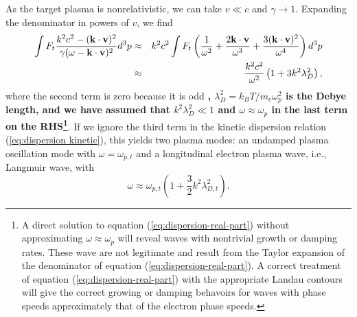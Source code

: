 \documentclass[usenatbib,iop,apj]{emulateapj}
\newcommand\cc[1]{{\color{blue} \bf #1}}
\newcommand\bmath[1] {\mbox{\boldmath$\rm #1$}}
\newcommand{\vel}{\ensuremath{\bmath{v}}}
\newcommand{\kvec}{\ensuremath{\bmath{k}}}
\begin{document}
As the target plasma is nonrelativistic, we can take $v\ll c$ and $\gamma \rightarrow 1$.  Expanding the denominator in powers of $v$, we find
\begin{eqnarray}
 \int F_t\frac{k^2c^2 - (\kvec\cdot\vel)^2}{\gamma(\omega - \kvec\cdot\vel)^2} d^3p &\approx& k^2c^2
 \int F_t \left(\frac {1}{\omega^2} + \frac {2\kvec\cdot\vel}{\omega^3} + \frac{3 (\kvec\cdot\vel)^2}{\omega^4}\right) d^3p \nonumber \\
&\approx& \frac {k^2c^2}{\omega^2}\left(1 + 3 {k^2\lambda_D^2}\right),
\label{eq:dispersion-real-part}
\end{eqnarray}
where the second term is zero because it is odd\cc{, $\lambda_D^2 = k_B T/m_e \omega_p^2$ is the Debye length, and we have assumed that $k^2\lambda_D^2 \ll 1$ and $\omega \approx \omega_p$ in the last term on the RHS\footnote{A direct solution to equation (\ref{eq:dispersion-real-part}) without approximating $\omega\approx \omega_p$ will reveal waves with nontrivial growth or damping rates.  These wave are not legitimate and result from the Taylor expansion of the denominator of equation (\ref{eq:dispersion-real-part}).  A correct treatment of equation (\ref{eq:dispersion-real-part}) with the appropriate Landau contours will give the correct growing or damping behavoirs for waves with phase speeds approximately that of the electron phase speeds.}}. If we ignore the third term in the kinetic dispersion relation (\ref{eq:dispersion kinetic}), this yields two plasma modes: an undamped plasma oscillation mode with $\omega = \omega_{p,t}$ and a longitudinal electron plasma wave, i.e., Langmuir wave, with
\begin{equation}
\omega \approx \omega_{p,t}\left(1 + \frac 3 2 k^2\lambda_{D,t}^2\right).
\end{equation}
\end{document}
